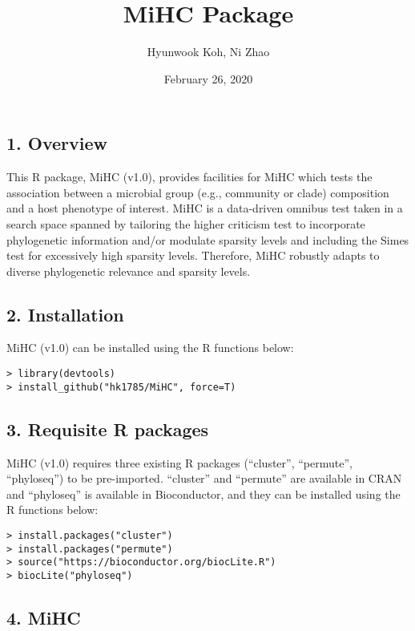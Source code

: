 \documentclass[
]{article}
\title{MiHC Package}
\author{Hyunwook Koh, Ni Zhao}
\date{February 26, 2020}
\begin{document}
\maketitle

\hypertarget{overview}{%
\subsection{1. Overview}\label{overview}}

This R package, MiHC (v1.0), provides facilities for MiHC which tests
the association between a microbial group (e.g., community or clade)
composition and a host phenotype of interest. MiHC is a data-driven
omnibus test taken in a search space spanned by tailoring the higher
criticism test to incorporate phylogenetic information and/or modulate
sparsity levels and including the Simes test for excessively high
sparsity levels. Therefore, MiHC robustly adapts to diverse phylogenetic
relevance and sparsity levels.

\hypertarget{installation}{%
\subsection{2. Installation}\label{installation}}

MiHC (v1.0) can be installed using the R functions below:

\begin{verbatim}
> library(devtools)
> install_github("hk1785/MiHC", force=T)
\end{verbatim}

\hypertarget{requisite-r-packages}{%
\subsection{3. Requisite R packages}\label{requisite-r-packages}}

MiHC (v1.0) requires three existing R packages (``cluster'',
``permute'', ``phyloseq'') to be pre-imported. ``cluster'' and
``permute'' are available in CRAN and ``phyloseq'' is available in
Bioconductor, and they can be installed using the R functions below:

\begin{verbatim}
> install.packages("cluster")
> install.packages("permute")
> source("https://bioconductor.org/biocLite.R")
> biocLite("phyloseq")
\end{verbatim}

\hypertarget{mihc}{%
\subsection{4. MiHC}\label{mihc}}
\end{document}

